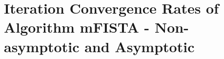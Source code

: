 \documentclass[11pt]{article}
\newtheorem{assumption}[thm]{Assumption}
\begin{document}


\section{Iteration Convergence Rates of Algorithm mFISTA - Non-asymptotic and Asymptotic}\label{sec:mFISTA}

%
%
%

%
\end{document}
